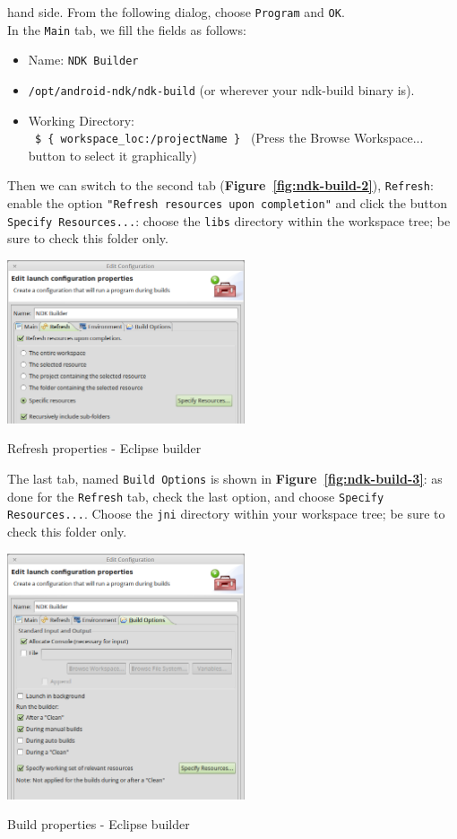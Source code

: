 \documentclass[a4paper,10pt]{article}
\makeatletter
\newenvironment{figurehere}{\def\@captype{figure}\vspace{2ex}}{\vspace{2ex}}
\newcommand{\reff}[1]{\textbf{Figure~\ref{#1}}}
\makeatother
\begin{document}
\begin{multicols}{2}
hand side. From the following dialog, choose \texttt{Program} and \texttt{OK}.\\
In the \texttt{Main} tab, we fill the fields as follows:
\begin{itemize}
\item Name: \texttt{NDK Builder}
\item \texttt{/opt/android-ndk/ndk-build} (or wherever your ndk-build binary is).
\item Working Directory:\\
\texttt{ \$ \{ workspace\_loc:/projectName \} } (Press the Browse Workspace... 
button to select it graphically)
\end{itemize}
Then we can switch to the second tab (\reff{fig:ndk-build-2}), \texttt{Refresh}:
enable the option \texttt{"Refresh resources upon completion"} and click the
button \texttt{Specify Resources...}: choose the \texttt{libs} directory within
the workspace tree; be sure to check this folder only.

\begin{figurehere}
 \centering
 \includegraphics[width=7cm]{./figures/ndk-build-2.png}
 \caption{Refresh properties - Eclipse builder}
 \label{fig:ndk-build-2}
\end{figurehere}

The last tab, named \texttt{Build Options} is shown in \reff{fig:ndk-build-3}:
as done for the \texttt{Refresh} tab, check the last option, and choose
\texttt{Specify Resources...}. Choose the \texttt{jni} directory within your
workspace tree; be sure to check this folder only.

\begin{figurehere}
 \centering
 \includegraphics[width=7cm]{./figures/ndk-build-3.png}
 \caption{Build properties - Eclipse builder}
 \label{fig:ndk-build-3}
\end{figurehere}


\end{multicols}
\end{document}
